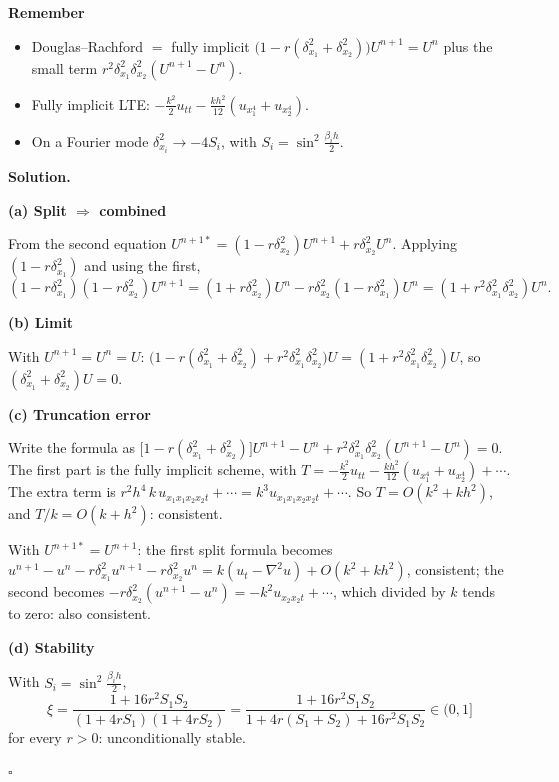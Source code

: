 \documentclass[11pt,a4paper]{article}
\newenvironment{rem}
  {\begin{remember}\noindent\textbf{Remember}\par\nobreak\vspace{-0.3em}}
  {\end{remember}}
\newenvironment{solution}
  {\par\noindent\textbf{Solution.}\par\nobreak}
  {\par\nobreak\noindent\hfill\(\square\)\par}
\newcommand{\step}[1]{\par\addvspace{0.5em}\noindent\textbf{#1}\par\nobreak}
\begin{document}
\begin{rem}
\begin{itemize}
  \item Douglas--Rachford \(=\) fully implicit
    \(\bigl(1-r(\delta_{x_1}^2+\delta_{x_2}^2)\bigr)U^{n+1}=U^n\) plus the
    small term \(r^2\delta_{x_1}^2\delta_{x_2}^2(U^{n+1}-U^n)\).
  \item Fully implicit LTE: \(-\frac{k^2}2u_{tt}-\frac{kh^2}{12}(u_{x_1^4}+u_{x_2^4})\).
  \item On a Fourier mode \(\delta_{x_i}^2\to-4S_i\), with
    \(S_i=\sin^2\frac{\beta_ih}2\).
\end{itemize}
\end{rem}

\begin{solution}
\step{(a) Split \(\Rightarrow\) combined}
From the second equation
\(U^{n+1*}=(1-r\delta_{x_2}^2)U^{n+1}+r\delta_{x_2}^2U^n\).  Applying
\((1-r\delta_{x_1}^2)\) and using the first,
\[
  (1-r\delta_{x_1}^2)(1-r\delta_{x_2}^2)U^{n+1}
  =(1+r\delta_{x_2}^2)U^n-r\delta_{x_2}^2(1-r\delta_{x_1}^2)U^n
  =(1+r^2\delta_{x_1}^2\delta_{x_2}^2)U^n .
\]
\step{(b) Limit}
With \(U^{n+1}=U^n=U\):
\(\bigl(1-r(\delta_{x_1}^2+\delta_{x_2}^2)+r^2\delta_{x_1}^2\delta_{x_2}^2\bigr)U
=(1+r^2\delta_{x_1}^2\delta_{x_2}^2)U\), so
\((\delta_{x_1}^2+\delta_{x_2}^2)U=0\).

\step{(c) Truncation error}
Write the formula as
\(\bigl[1-r(\delta_{x_1}^2+\delta_{x_2}^2)\bigr]U^{n+1}-U^n
+r^2\delta_{x_1}^2\delta_{x_2}^2(U^{n+1}-U^n)=0\).  The first part is
the fully implicit scheme, with \(T=-\frac{k^2}2u_{tt}-\frac{kh^2}{12}(u_{x_1^4}+u_{x_2^4})+\cdots\).
The extra term is
\(r^2h^4\,k\,u_{x_1x_1x_2x_2t}+\cdots=k^3u_{x_1x_1x_2x_2t}+\cdots\).
So \(T=O(k^2+kh^2)\), and \(T/k=O(k+h^2)\): consistent.

With \(U^{n+1*}=U^{n+1}\): the first split formula becomes
\(u^{n+1}-u^n-r\delta_{x_1}^2u^{n+1}-r\delta_{x_2}^2u^n=k(u_t-\nabla^2u)+O(k^2+kh^2)\),
consistent; the second becomes
\(-r\delta_{x_2}^2(u^{n+1}-u^n)=-k^2u_{x_2x_2t}+\cdots\), which divided by
\(k\) tends to zero: also consistent.

\step{(d) Stability}
With \(S_i=\sin^2\frac{\beta_ih}2\),
\[
  \xi=\frac{1+16r^2S_1S_2}{(1+4rS_1)(1+4rS_2)}
  =\frac{1+16r^2S_1S_2}{1+4r(S_1+S_2)+16r^2S_1S_2}\in(0,1]
\]
for every \(r>0\): unconditionally stable.
\end{solution}
\end{document}
